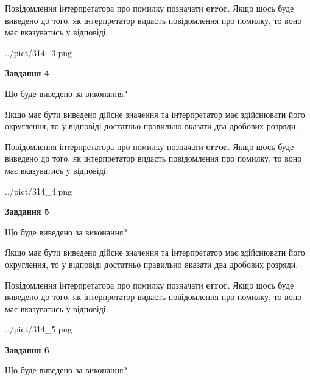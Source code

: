 \documentclass[12pt, ukrainian]{article}
\begin{document}
{\begin {Large}
Повідомлення інтерпретатора про помилку позначати \textbf{error}.
Якщо щось буде виведено до того, як інтерпретатор видасть повідомлення про помилку, 
то воно має вказуватись у відповіді. \par

\begin{center}
	{../pict/314_3.png}
\end{center}
\newpage

{\begin {center}\textbf{Завдання 4}\end {center}}\par
Що буде виведено за виконання? \par

Якщо має бути виведено дійсне значення та інтерпретатор має здійснювати його округлення, 
то у відповіді достатньо правильно вказати два дробових розряди.

Повідомлення інтерпретатора про помилку позначати \textbf{error}.
Якщо щось буде виведено до того, як інтерпретатор видасть повідомлення про помилку, 
то воно має вказуватись у відповіді. \par

\begin{center}
	{../pict/314_4.png}
\end{center}
\newpage

{\begin {center}\textbf{Завдання 5}\end {center}}\par
Що буде виведено за виконання? \par

Якщо має бути виведено дійсне значення та інтерпретатор має здійснювати його округлення, 
то у відповіді достатньо правильно вказати два дробових розряди.

Повідомлення інтерпретатора про помилку позначати \textbf{error}.
Якщо щось буде виведено до того, як інтерпретатор видасть повідомлення про помилку, 
то воно має вказуватись у відповіді. \par

\begin{center}
	{../pict/314_5.png}
\end{center}
\newpage

{\begin {center}\textbf{Завдання 6}\end {center}}\par
Що буде виведено за виконання? \par


\end{Large}}
\end{document}
